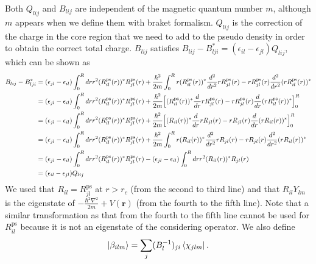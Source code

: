\documentclass{article}
\begin{document}
Both $Q_{lij}$ and $B_{lij}$ are independent of the magnetic quantum number $m$, although $m$ appears when we define them with braket formalism.
$Q_{lij}$ is the correction of the charge in the core region that we need to add to the pseudo density in order to obtain the correct total charge.
$B_{lij}$ satisfies $B_{lij} - B_{lji}^* = (\epsilon_{il} - \epsilon_{jl}) Q_{lij}$, which can be shown as
\begin{align}
  B_{lij} - B_{lji}^* 
  &=
  (\epsilon_{jl} - \epsilon_{il}) \int_0^R dr r^2 (R^{\text{ps}}_{il}(r))^* R^{\text{ps}}_{jl}(r)
  + \frac{\hbar^2}{2m} \int_0^R r (R^{\text{ps}}_{il}(r))^* \frac{d^2}{dr^2} rR^{\text{ps}}_{jl}(r) - rR^{\text{ps}}_{jl}(r) \frac{d^2}{dr^2} (rR^{\text{ps}}_{il}(r))^* 
  \nonumber
  \\&=
  (\epsilon_{jl} - \epsilon_{il}) \int_0^R dr r^2 (R^{\text{ps}}_{il}(r))^* R^{\text{ps}}_{jl}(r)
  + \frac{\hbar^2}{2m}
  \Bigl[
    (R^{\text{ps}}_{il}(r))^* \frac{d}{dr} rR^{\text{ps}}_{jl}(r) - rR^{\text{ps}}_{jl}(r) \frac{d}{dr} (rR^{\text{ps}}_{il}(r))^* 
  \Bigr]_0^R
  \nonumber
  \\&=
  (\epsilon_{jl} - \epsilon_{il}) \int_0^R dr r^2 (R^{\text{ps}}_{il}(r))^* R^{\text{ps}}_{jl}(r)
  + \frac{\hbar^2}{2m}
  \Bigl[
    (R_{il}(r))^* \frac{d}{dr} rR_{jl}(r) - rR_{jl}(r) \frac{d}{dr} (rR_{il}(r))^* 
  \Bigr]_0^R
  \nonumber
  \\&=
  (\epsilon_{jl} - \epsilon_{il}) \int_0^R dr r^2 (R^{\text{ps}}_{il}(r))^* R^{\text{ps}}_{jl}(r)
  + \frac{\hbar^2}{2m} \int_0^R r (R_{il}(r))^* \frac{d^2}{dr^2} rR_{jl}(r) - rR_{jl}(r) \frac{d^2}{dr^2} (rR_{il}(r))^* 
  \nonumber
  \\&=
  (\epsilon_{jl} - \epsilon_{il}) \int_0^R dr r^2 (R^{\text{ps}}_{il}(r))^* R^{\text{ps}}_{jl}(r) - (\epsilon_{jl} - \epsilon_{il}) \int_0^R dr r^2 (R_{il}(r))^* R_{jl}(r)
  \nonumber 
  \\&= (\epsilon_{il} - \epsilon_{jl}) Q_{lij}
\end{align}
We used that $R_{il} = R^{\text{ps}}_{jl}$ at $r > r_c$ (from the second to third line) and that $R_{il}Y_{lm}$ is the eigenstate of $ - \frac{\hbar^2\nabla^2}{2m} + V(\bm{r}) $ (from the fourth to the fifth line). Note that a similar transformation as that from the fourth to the fifth line cannot be used for $R^{\text{ps}}_{il}$ because it is not an eigenstate of the considering operator.
We also define
\begin{align}
  \ket{\beta_{ilm}} = \sum_j (B^{-1}_l)_{ji} \bra{\chi_{jlm}}.
\end{align}
\end{document}
